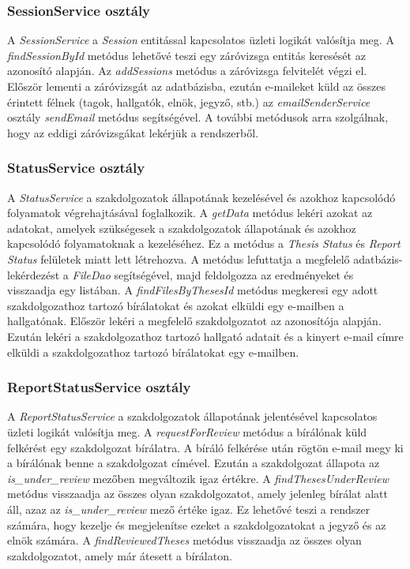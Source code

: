 \subsubsection{SessionService osztály}

A \textit{SessionService} a \textit{Session} entitással kapcsolatos üzleti logikát valósítja meg. A \textit{findSessionById} metódus lehetővé teszi egy záróvizsga entitás keresését az azonosító alapján. Az \textit{addSessions} metódus a záróvizsga felvitelét végzi el. Először lementi a záróvizsgát az adatbázisba, ezután e-maileket küld az összes érintett félnek (tagok, hallgatók, elnök, jegyző, stb.) az \textit{emailSenderService} osztály \textit{sendEmail} metódus segítségével. A további metódusok arra szolgálnak, hogy az eddigi záróvizsgákat lekérjük a rendszerből.

\subsubsection{StatusService osztály}

A \textit{StatusService} a szakdolgozatok állapotának kezelésével és azokhoz kapcsolódó folyamatok végrehajtásával foglalkozik. A \textit{getData} metódus lekéri azokat az adatokat, amelyek szükségesek a szakdolgozatok állapotának és azokhoz kapcsolódó folyamatoknak a kezeléséhez. Ez a metódus a \textit{Thesis Status} és \textit{Report Status} felületek miatt lett létrehozva. A metódus lefuttatja a megfelelő adatbázis-lekérdezést a \textit{FileDao} segítségével, majd feldolgozza az eredményeket és visszaadja egy listában. A \textit{findFilesByThesesId} metódus megkeresi egy adott szakdolgozathoz tartozó bírálatokat és azokat elküldi egy e-mailben a hallgatónak. Először lekéri a megfelelő szakdolgozatot az azonosítója alapján. Ezután lekéri a szakdolgozathoz tartozó hallgató adatait és a kinyert e-mail címre elküldi a szakdolgozathoz tartozó bírálatokat egy e-mailben.


\subsubsection{ReportStatusService osztály}

A \textit{ReportStatusService} a szakdolgozatok állapotának jelentésével kapcsolatos üzleti logikát valósítja meg. A \textit{requestForReview} metódus a bírálónak küld felkérést egy szakdolgozat bírálatra. A bíráló felkérése után rögtön e-mail megy ki a bírálónak benne a szakdolgozat címével. Ezután a szakdolgozat állapota az \textit{is\_under\_review} mezőben megváltozik igaz értékre. A \textit{findThesesUnderReview} metódus visszaadja az összes olyan szakdolgozatot, amely jelenleg bírálat alatt áll, azaz az \textit{is\_under\_review} mező értéke igaz. Ez lehetővé teszi a rendszer számára, hogy kezelje és megjelenítse ezeket a szakdolgozatokat a jegyző és az elnök számára. A \textit{findReviewedTheses} metódus visszaadja az összes olyan szakdolgozatot, amely már átesett a bírálaton. 

